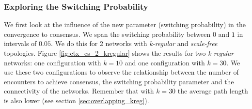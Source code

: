 \documentclass[preprint,number]{elsarticle}
\begin{document}
\subsubsection{Exploring the Switching Probability}
\noindent We first look at the influence of the new parameter (switching probability) in the convergence to consensus. We span the switching probability between $0$ and $1$ in intervals of $0.05$. We do this for 2 networks with \textit{k-regular} and \textit{scale-free} topologies. Figure \ref{fig:ctx_cs_2_kregular} shows the results for two \textit{k-regular} networks: one configuration with $k = 10$ and one configuration with $k = 30$. We use these two configurations to observe the relationship between the number of encounters to achieve consensus, the switching probability parameter and the connectivity of the networks. Remember that with $k=30$ the average path length is also lower (see section \ref{sec:overlapping_kreg}). 
\end{document}
